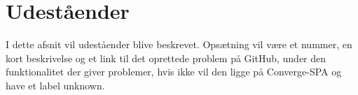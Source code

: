 \chapter{Udeståender}

I dette afsnit vil udeståender blive beskrevet. Opsætning vil være et nummer, en kort beskrivelse og et link til det oprettede problem på GitHub, under den funktionalitet der giver problemer, hvis ikke vil den ligge på Converge-SPA og have et label unknown.

